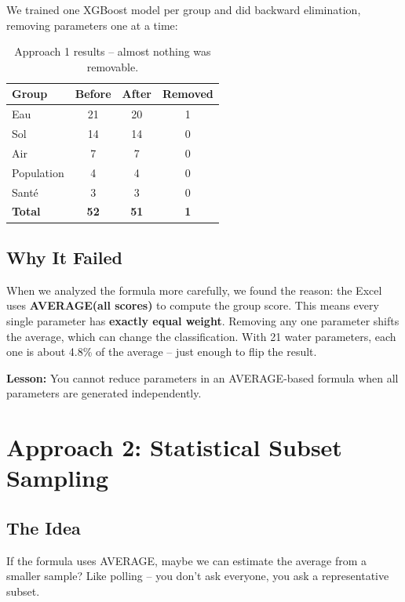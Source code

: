 \documentclass[12pt,a4paper]{article}
\begin{document}
We trained one XGBoost model per group and did backward elimination, removing parameters one at a time:

\begin{table}[H]
\centering
\begin{tabular}{lccc}
\toprule
\textbf{Group} & \textbf{Before} & \textbf{After} & \textbf{Removed} \\
\midrule
Eau & 21 & 20 & 1 \\
Sol & 14 & 14 & 0 \\
Air & 7 & 7 & 0 \\
Population & 4 & 4 & 0 \\
Sant\'e & 3 & 3 & 0 \\
\midrule
\textbf{Total} & \textbf{52} & \textbf{51} & \textbf{1} \\
\bottomrule
\end{tabular}
\caption{Approach 1 results -- almost nothing was removable.}
\end{table}

\subsection{Why It Failed}

When we analyzed the formula more carefully, we found the reason: the Excel uses \textbf{AVERAGE(all scores)} to compute the group score. This means every single parameter has \textbf{exactly equal weight}. Removing any one parameter shifts the average, which can change the classification. With 21 water parameters, each one is about 4.8\% of the average -- just enough to flip the result.

\textbf{Lesson:} You cannot reduce parameters in an AVERAGE-based formula when all parameters are generated independently.

\section{Approach 2: Statistical Subset Sampling}

\subsection{The Idea}

If the formula uses AVERAGE, maybe we can estimate the average from a smaller sample? Like polling -- you don't ask everyone, you ask a representative subset.
\end{document}
